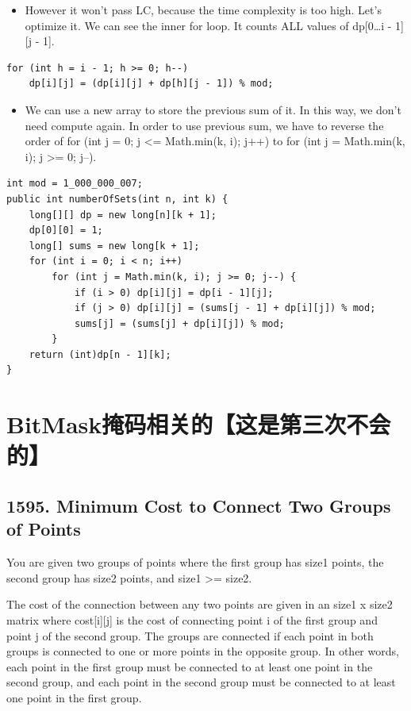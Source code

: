 \documentclass[9pt, b5paaper]{book}
\begin{document}
\begin{enumerate}
\begin{itemize}
\item However it won't pass LC, because the time complexity is too high. Let's optimize it. We can see the inner for loop. It counts ALL values of dp[0\ldots{}i - 1][j - 1].
\end{itemize}
\begin{verbatim}
for (int h = i - 1; h >= 0; h--) 
    dp[i][j] = (dp[i][j] + dp[h][j - 1]) % mod;
\end{verbatim}

\begin{itemize}
\item We can use a new array to store the previous sum of it. In this way, we don't need compute again. In order to use previous sum, we have to reverse the order of for (int j = 0; j <= Math.min(k, i); j++) to for (int j = Math.min(k, i); j >= 0; j--).
\end{itemize}
\begin{verbatim}
int mod = 1_000_000_007;
public int numberOfSets(int n, int k) {
    long[][] dp = new long[n][k + 1];
    dp[0][0] = 1;
    long[] sums = new long[k + 1];
    for (int i = 0; i < n; i++) 
        for (int j = Math.min(k, i); j >= 0; j--) {
            if (i > 0) dp[i][j] = dp[i - 1][j];
            if (j > 0) dp[i][j] = (sums[j - 1] + dp[i][j]) % mod;
            sums[j] = (sums[j] + dp[i][j]) % mod;
        }
    return (int)dp[n - 1][k];
}
\end{verbatim}
\end{enumerate}

\section{BitMask掩码相关的【这是第三次不会的】}
\label{sec-1-6}
\subsection{1595. Minimum Cost to Connect Two Groups of Points}
\label{sec-1-6-1}
You are given two groups of points where the first group has size1 points, the second group has size2 points, and size1 >= size2.

The cost of the connection between any two points are given in an size1 x size2 matrix where cost[i][j] is the cost of connecting point i of the first group and point j of the second group. The groups are connected if each point in both groups is connected to one or more points in the opposite group. In other words, each point in the first group must be connected to at least one point in the second group, and each point in the second group must be connected to at least one point in the first group.
\end{document}
